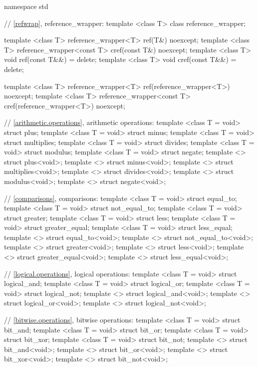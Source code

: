 %
\begin{codeblock}
namespace std {
  // \ref{refwrap}, reference_wrapper:
  template <class T> class reference_wrapper;

  template <class T> reference_wrapper<T> ref(T&) noexcept;
  template <class T> reference_wrapper<const T> cref(const T&) noexcept;
  template <class T> void ref(const T&&) = delete;
  template <class T> void cref(const T&&) = delete;

  template <class T> reference_wrapper<T> ref(reference_wrapper<T>) noexcept;
  template <class T> reference_wrapper<const T> cref(reference_wrapper<T>) noexcept;

  // \ref{arithmetic.operations}, arithmetic operations:
  template <class T = void> struct plus;
  template <class T = void> struct minus;
  template <class T = void> struct multiplies;
  template <class T = void> struct divides;
  template <class T = void> struct modulus;
  template <class T = void> struct negate;
  template <> struct plus<void>;
  template <> struct minus<void>;
  template <> struct multiplies<void>;
  template <> struct divides<void>;
  template <> struct modulus<void>;
  template <> struct negate<void>;

  // \ref{comparisons}, comparisons:
  template <class T = void> struct equal_to;
  template <class T = void> struct not_equal_to;
  template <class T = void> struct greater;
  template <class T = void> struct less;
  template <class T = void> struct greater_equal;
  template <class T = void> struct less_equal;
  template <> struct equal_to<void>;
  template <> struct not_equal_to<void>;
  template <> struct greater<void>;
  template <> struct less<void>;
  template <> struct greater_equal<void>;
  template <> struct less_equal<void>;

  // \ref{logical.operations}, logical operations:
  template <class T = void> struct logical_and;
  template <class T = void> struct logical_or;
  template <class T = void> struct logical_not;
  template <> struct logical_and<void>;
  template <> struct logical_or<void>;
  template <> struct logical_not<void>;

  // \ref{bitwise.operations}, bitwise operations:
  template <class T = void> struct bit_and;
  template <class T = void> struct bit_or;
  template <class T = void> struct bit_xor;
  template <class T = void> struct bit_not;
  template <> struct bit_and<void>;
  template <> struct bit_or<void>;
  template <> struct bit_xor<void>;
  template <> struct bit_not<void>;

}
\end{codeblock}
